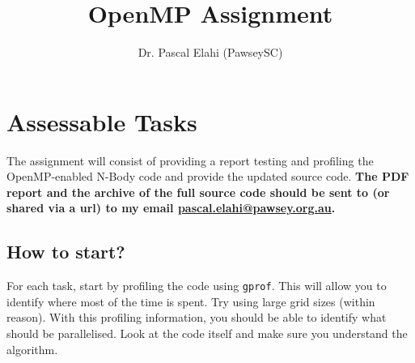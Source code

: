 \documentclass[11pt]{amsart}
\title[OpenMP]{OpenMP Assignment}
\author[]{Dr. Pascal Elahi (PawseySC)}
\begin{document}
\maketitle
\pagestyle{plain}


\newpage
\section{Assessable Tasks}\label{sec:tasks}
\begin{center}
  \large
  The assignment will consist of providing a report testing and profiling the OpenMP-enabled N-Body code and provide the updated source code. 
  \textbf{The PDF report and the archive of the full source code should be sent to (or shared via a url) to my email \href{mailto:pascal.elahi@pawsey.org.au}{pascal.elahi@pawsey.org.au}. }
\end{center}
\subsection*{How to start?\nopunct\\} \label{sec:tasks:staring}
For each task, start by profiling the code using \texttt{gprof}. This will allow you to identify where most of the time is spent. Try using large grid sizes (within reason). With this profiling information, you should be able to identify what should be parallelised. Look at the code itself and make sure you understand the algorithm.
\end{document}

